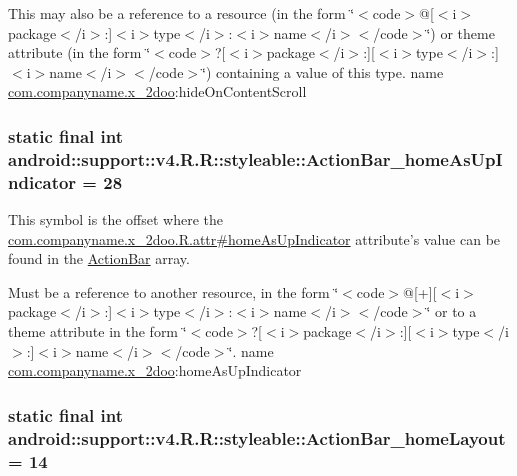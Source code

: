 This may also be a reference to a resource (in the form \char`\"{}$<$code$>$@\mbox{[}$<$i$>$package$<$/i$>$:\mbox{]}$<$i$>$type$<$/i$>$:$<$i$>$name$<$/i$>$$<$/code$>$\char`\"{}) or theme attribute (in the form \char`\"{}$<$code$>$?\mbox{[}$<$i$>$package$<$/i$>$:\mbox{]}\mbox{[}$<$i$>$type$<$/i$>$:\mbox{]}$<$i$>$name$<$/i$>$$<$/code$>$\char`\"{}) containing a value of this type.  name \hyperlink{namespacecom_1_1companyname_1_1x__2doo}{com.companyname.x\_\-2doo}:hideOnContentScroll \hypertarget{classandroid_1_1support_1_1v4_1_1_r_1_1styleable_e0ce4cd42f818c233a5c824e297a6329}{
\subsubsection[{ActionBar\_\-homeAsUpIndicator}]{\setlength{\rightskip}{0pt plus 5cm}static final int android::support::v4.R.R::styleable::ActionBar\_\-homeAsUpIndicator = 28}}
\label{classandroid_1_1support_1_1v4_1_1_r_1_1styleable_e0ce4cd42f818c233a5c824e297a6329}


This symbol is the offset where the \hyperlink{classcom_1_1companyname_1_1x__2doo_1_1_r_1_1attr_f60b6d313356916d6f1f95bacce2873a}{com.companyname.x\_\-2doo.R.attr\#homeAsUpIndicator} attribute's value can be found in the \hyperlink{classandroid_1_1support_1_1v4_1_1_r_1_1styleable_5c6cf2c83551ebae05f365bb913fdddf}{ActionBar} array.

Must be a reference to another resource, in the form \char`\"{}$<$code$>$@\mbox{[}+\mbox{]}\mbox{[}$<$i$>$package$<$/i$>$:\mbox{]}$<$i$>$type$<$/i$>$:$<$i$>$name$<$/i$>$$<$/code$>$\char`\"{} or to a theme attribute in the form \char`\"{}$<$code$>$?\mbox{[}$<$i$>$package$<$/i$>$:\mbox{]}\mbox{[}$<$i$>$type$<$/i$>$:\mbox{]}$<$i$>$name$<$/i$>$$<$/code$>$\char`\"{}.  name \hyperlink{namespacecom_1_1companyname_1_1x__2doo}{com.companyname.x\_\-2doo}:homeAsUpIndicator \hypertarget{classandroid_1_1support_1_1v4_1_1_r_1_1styleable_5bac411a91b290a049eda35aa2ffac76}{
\subsubsection[{ActionBar\_\-homeLayout}]{\setlength{\rightskip}{0pt plus 5cm}static final int android::support::v4.R.R::styleable::ActionBar\_\-homeLayout = 14}}
\label{classandroid_1_1support_1_1v4_1_1_r_1_1styleable_5bac411a91b290a049eda35aa2ffac76}


